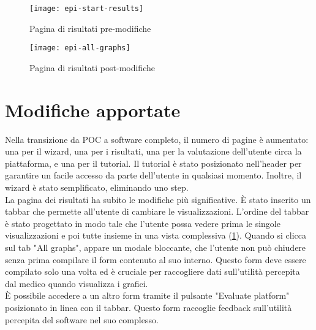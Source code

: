 
\begin{figure}[htbp]
    \centering
    \begin{minipage}{0.45\textwidth}
        \centering 
    \texttt{[image: epi-start-results]} 
    \caption{Pagina di risultati pre-modifiche}
    \label{fig:epi-start-results}
    \end{minipage}\hfill
    \begin{minipage}{0.45\textwidth}
        \centering 
    \texttt{[image: epi-all-graphs]} 
    \caption{Pagina di risultati post-modifiche}
    \label{fig:epi-all-graphs}
    \end{minipage}
\end{figure}

\section{Modifiche apportate}

Nella transizione da POC a software completo, il numero di pagine è aumentato: una per il wizard, una per i risultati, una per la valutazione dell'utente circa la piattaforma, e una per il tutorial. Il tutorial è stato posizionato nell'header per garantire un facile accesso da parte dell'utente in qualsiasi momento. Inoltre, il wizard è stato semplificato, eliminando uno step.\\
La pagina dei risultati ha subito le modifiche più significative. È stato inserito un tabbar che permette all'utente di cambiare le visualizzazioni. L'ordine del tabbar è stato progettato in modo tale che l'utente possa vedere prima le singole visualizzazioni e poi tutte insieme in una vista complessiva (\ref{fig:epi-all-graphs}). Quando si clicca sul tab "All graphs", appare un modale bloccante, che l'utente non può chiudere senza prima compilare il form contenuto al suo interno. Questo form deve essere compilato solo una volta ed è cruciale per raccogliere dati sull'utilità percepita dal medico quando visualizza i grafici.\\
È possibile accedere a un altro form tramite il pulsante "Evaluate platform" posizionato in linea con il tabbar. Questo form raccoglie feedback sull'utilità percepita del software nel suo complesso.\\

